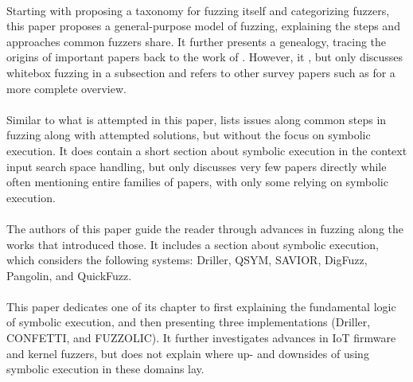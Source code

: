 \documentclass{article}
\begin{document}
\begin{multicols}{2}
    \paragraph{}
    Starting with proposing a taxonomy for fuzzing itself and categorizing fuzzers, this paper proposes a general-purpose model of fuzzing, explaining the steps and approaches common fuzzers share. It further presents a genealogy, tracing the origins of important papers back to the work of \citeauthor*{UNIX}. However, it \cite{ArtScienceEng}, but only discusses whitebox fuzzing in a subsection and refers to other survey papers such as \cite{Orchestrated, AllYouEverWanted} for a more complete overview.

    \paragraph{}
    Similar to what is attempted in this paper,  lists issues along common steps in fuzzing along with attempted solutions, but without the focus on symbolic execution. It does contain a short section about symbolic execution in the context input search space handling, but only discusses very few papers directly while often mentioning entire families of papers, with only some relying on symbolic execution.

    \paragraph{}
    The authors of this paper guide the reader through advances in fuzzing along the works that introduced those. It includes a section about symbolic execution, which considers the following systems: Driller\cite{Driller}, QSYM\cite{QSYM}, SAVIOR\cite{SAVIOR}, DigFuzz\cite{DigFuzz}, Pangolin\cite{Pangolin}, and QuickFuzz\cite{QuickFuzz}.

    \paragraph{}
    This paper dedicates one of its chapter to first explaining the fundamental logic of symbolic execution, and then presenting three implementations (Driller\cite{Driller}, CONFETTI\cite{CONFETTI}, and FUZZOLIC\cite{FUZZOLIC}). It further investigates advances in IoT firmware and kernel fuzzers, but does not explain where up- and downsides of using symbolic execution in these domains lay.


\end{multicols}
\end{document}
